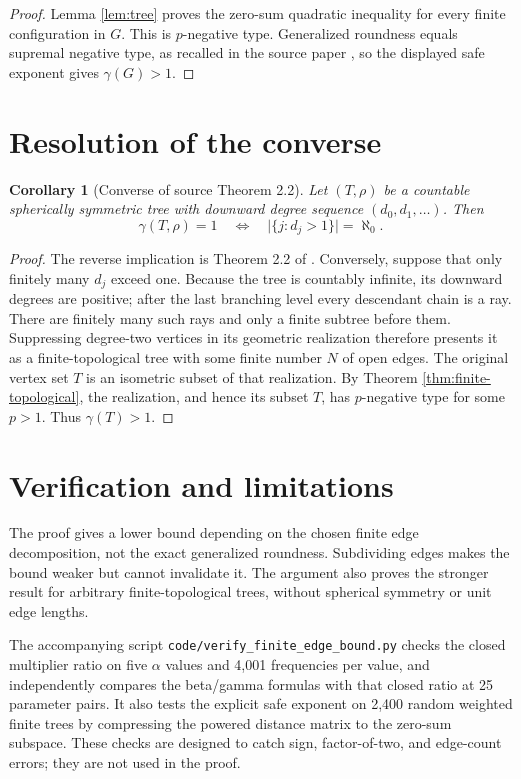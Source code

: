 \documentclass[11pt]{article}
\newtheorem{corollary}[theorem]{Corollary}
\begin{document}
\begin{proof}
Lemma \ref{lem:tree} proves the zero-sum quadratic inequality for every finite
configuration in $G$.  This is $p$-negative type.  Generalized roundness equals
supremal negative type, as recalled in the source paper
\cite{CaffarelliDoustWeston}, so the displayed safe exponent gives
$\gamma(G)>1$.
\end{proof}

\section{Resolution of the converse}

\begin{corollary}[Converse of source Theorem 2.2]
Let $(T,\rho)$ be a countable spherically symmetric tree with downward degree
sequence $(d_0,d_1,\ldots)$.  Then
\[
 \gamma(T,\rho)=1
 \quad\Longleftrightarrow\quad
 \bigl|\{j:d_j>1\}\bigr|=\aleph_0.
\]
\end{corollary}

\begin{proof}
The reverse implication is Theorem 2.2 of
\cite{CaffarelliDoustWeston}.  Conversely, suppose that only finitely many
$d_j$ exceed one.  Because the tree is countably infinite, its downward
degrees are positive; after the last branching level every descendant chain
is a ray.  There are finitely many such rays and only a finite subtree before
them.  Suppressing degree-two vertices in its geometric realization therefore
presents it as a finite-topological tree with some finite number $N$ of open
edges.  The original vertex set $T$ is an isometric subset of that realization.
By Theorem \ref{thm:finite-topological}, the realization, and hence its subset
$T$, has $p$-negative type for some $p>1$.  Thus $\gamma(T)>1$.
\end{proof}

\section{Verification and limitations}

The proof gives a lower bound depending on the chosen finite edge
decomposition, not the exact generalized roundness.  Subdividing edges makes
the bound weaker but cannot invalidate it.  The argument also proves the
stronger result for arbitrary finite-topological trees, without spherical
symmetry or unit edge lengths.

The accompanying script \texttt{code/verify\_finite\_edge\_bound.py} checks
the closed multiplier ratio on five $\alpha$ values and 4,001 frequencies per
value, and independently compares the beta/gamma formulas with that closed
ratio at 25 parameter pairs.  It also tests the explicit safe exponent on
2,400 random weighted finite trees by compressing the powered distance matrix
to the zero-sum subspace.  These checks are designed to catch sign,
factor-of-two, and edge-count errors; they are not used in the proof.
\end{document}

